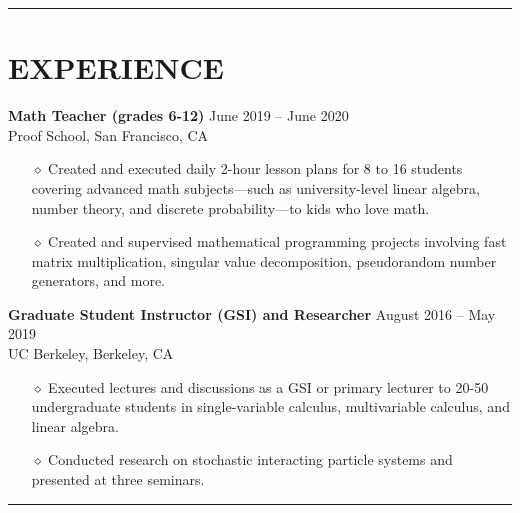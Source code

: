 \documentclass{simplecv}
\begin{document}
\vspace{-0.4cm}

\rule{10cm}{0.5pt}

\vspace{-0.4cm}

\section{EXPERIENCE}
{\bf Math Teacher (grades 6-12)} \hfill June 2019 -- June 2020 \\
Proof School, San Francisco, CA
\begin{itemize}
  \itemsep0em 
  \item[$\diamond$] Created and executed daily 2-hour lesson plans for 8 to 16 students covering advanced math subjects---such as university-level linear algebra, number theory, and discrete probability---to kids who love math.
  \item[$\diamond$] Created and supervised mathematical programming projects involving fast matrix multiplication, singular value decomposition, pseudorandom number generators, and more.
\end{itemize}
{\bf Graduate Student Instructor (GSI) and Researcher} \hfill August 2016 -- May 2019 \\
UC Berkeley, Berkeley, CA
\begin{itemize}
  \itemsep0em
  \item[$\diamond$] Executed lectures and discussions as a GSI or primary lecturer to 20-50 undergraduate students in single-variable calculus, multivariable calculus, and linear algebra.
  \item[$\diamond$] Conducted research on stochastic interacting particle systems and presented at three seminars.
\end{itemize}

\vspace{-0.4cm}

\rule{10cm}{0.5pt}

\vspace{-0.4cm}
\end{document}

